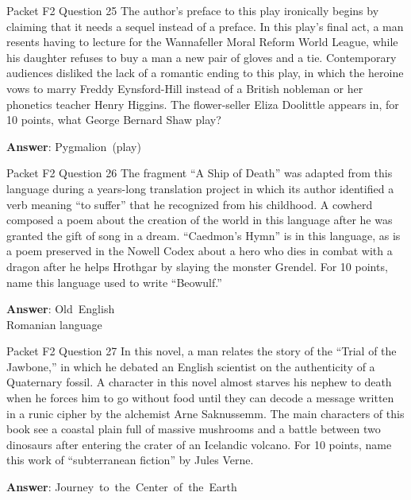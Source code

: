 \begin{frame}{Packet F2 Question 25}
The author’s preface to this play ironically begins by claiming that it needs a sequel instead of a preface. In this play’s final act, a man resents having to lecture for the Wannafeller Moral Reform World   League, while his daughter refuses to buy a man a new pair of gloves and a tie. Contemporary audiences disliked the lack of a romantic ending to this play, in which the heroine vows to marry Freddy Eynsford-Hill instead   of a British nobleman or her phonetics teacher Henry Higgins. The flower-seller Eliza Doolittle     appears in, for 10 points, what George Bernard Shaw play?

\textbf{Answer}: Pygmalion\ (play)\\
\end{frame}

\begin{frame}{Packet F2 Question 26}
The fragment “A Ship of Death” was adapted from this language during a years-long translation project in which its author identified a verb meaning “to suffer” that he recognized from his childhood. A cowherd composed a poem about the creation of the world in this language after he was granted the gift   of song in a dream. “Caedmon’s Hymn” is   in this language, as is a poem preserved   in the Nowell Codex about a hero who   dies in combat with a dragon after he helps Hrothgar by slaying the monster Grendel. For 10 points,   name this language used to write “Beowulf.”

\textbf{Answer}: Old\ English\\
 Romanian language
\end{frame}

\begin{frame}{Packet F2 Question 27}
In this novel, a man relates the story of the “Trial of the Jawbone,” in which he debated an English scientist on the authenticity of a Quaternary fossil. A character in this novel almost starves his nephew to death when he forces him to go without food until they can decode a message written in a runic cipher by the alchemist Arne Saknussemm.   The main characters   of this book see a coastal plain full of massive mushrooms and a battle between   two dinosaurs after entering the crater of an Icelandic volcano. For 10 points,   name this work of “subterranean fiction” by Jules Verne.

\textbf{Answer}: Journey\ to\ the\ Center\ of\ the\ Earth\\
\end{frame}

